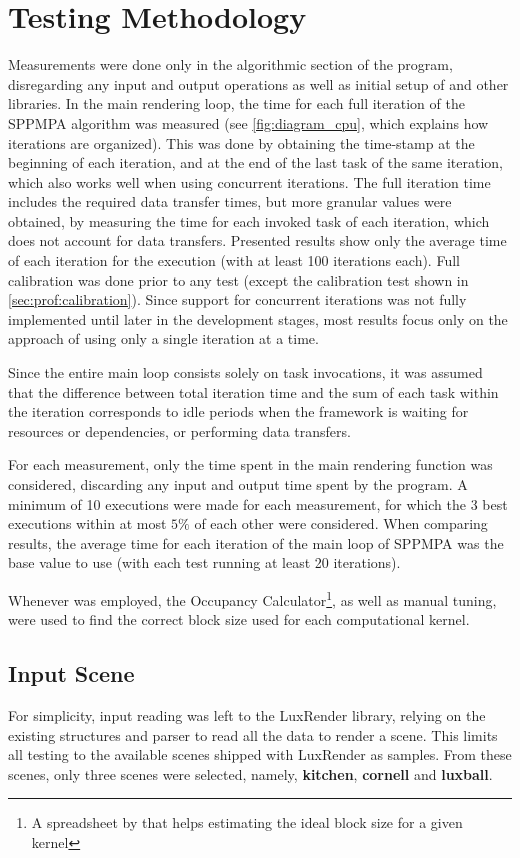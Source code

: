 \documentclass[main.tex]{subfiles}
\begin{document}
\section{Testing Methodology} \label{sec:results:method}

Measurements were done only in the algorithmic section of the program, disregarding any input and output operations as well as initial setup of \starpu and other libraries. In the main rendering loop, the time for each full iteration of the SPPMPA algorithm was measured (see \cref{fig:diagram_cpu}, which explains how iterations are organized). This was done by obtaining the time-stamp at the beginning of each iteration, and at the end of the last task of the same iteration, which also works well when using concurrent iterations. The full iteration time includes the required data transfer times, but more granular values were obtained, by measuring the time for each invoked task of each iteration, which does not account for data transfers. Presented results show only the average time of each iteration for the execution (with at least 100 iterations each). Full calibration was done prior to any \starpu test (except the calibration test shown in \cref{sec:prof:calibration}).
Since support for concurrent iterations was not fully implemented until later in the development stages, most results focus only on the approach of using only a single iteration at a time.

Since the entire main loop consists solely on task invocations, it was assumed that the difference between total iteration time and the sum of each task within the iteration corresponds to idle periods when the framework is waiting for resources or dependencies, or performing data transfers.

For each measurement, only the time spent in the main rendering function was considered, discarding any input and output time spent by the program. A minimum of 10 executions were made for each measurement, for which the 3 best executions within at most $5\%$ of each other were considered. When comparing results, the average time for each iteration of the main loop of SPPMPA was the base value to use (with each test running at least 20 iterations).

Whenever \cuda was employed, the \cuda Occupancy Calculator\footnote{A spreadsheet by \nvidia that helps estimating the ideal block size for a given kernel}, as well as manual tuning, were used to find the correct block size used for each computational kernel.

\subsection{Input Scene}

For simplicity, input reading was left to the LuxRender library, relying on the existing structures and parser to read all the data to render a scene. This limits all testing to the available scenes shipped with LuxRender as samples. From these scenes, only three scenes were selected, namely, \textbf{kitchen}, \textbf{cornell} and \textbf{luxball}.
\end{document}
